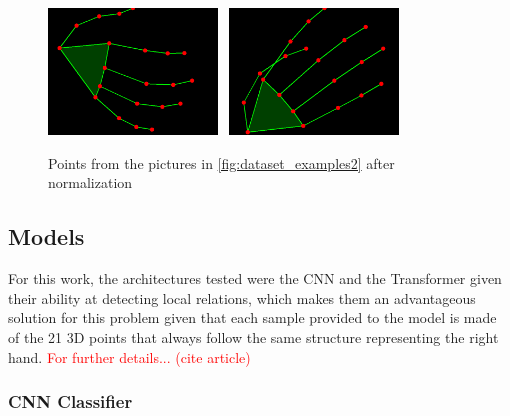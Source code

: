 \begin{figure}[ht]
    \centerline{\includegraphics[width=0.4\textwidth]{figs/dataset_preprocessing3_1.png} \ \includegraphics[width=0.4\textwidth]{figs/dataset_preprocessing3_2.png}}
    \caption{Points from the pictures in \autoref{fig:dataset_examples2} after normalization}
    \label{fig:dataset_examples3}
\end{figure}

\subsection{Models}

For this work, the architectures tested were the CNN and the Transformer given their ability at detecting local relations, which makes them an advantageous solution for this problem given that each sample provided to the model is made of the 21 3D points that always follow the same structure representing the right hand. \textcolor{red}{For further details... (cite article)}

\subsubsection{CNN Classifier}
\label{subsubsection:cnn_classifier}


